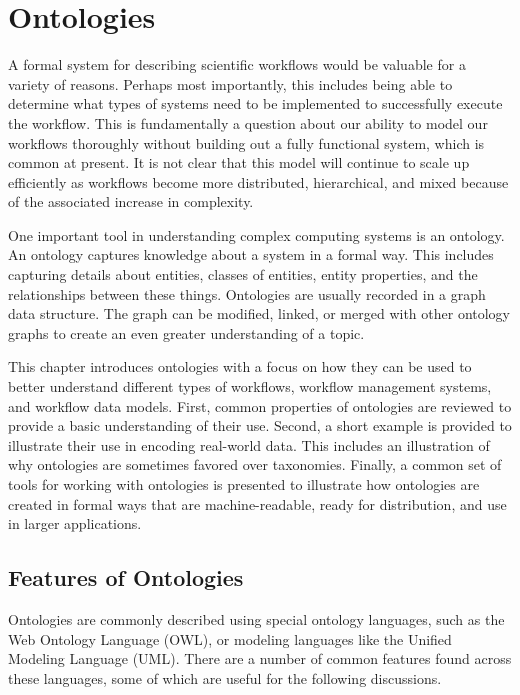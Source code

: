\chapter{Ontologies} \label{ch:ontologies}

A formal system for describing scientific workflows would be valuable for a
variety of reasons. Perhaps most importantly, this includes being able to
determine what types of systems need to be implemented to successfully execute
the workflow. This is fundamentally a question about our ability to model our
workflows thoroughly without building out a fully functional system, which is
common at present. It is not clear that this model will continue to scale up
efficiently as workflows become more distributed, hierarchical, and mixed
because of the associated increase in complexity. 

One important tool in understanding complex computing systems is an ontology.
An ontology captures knowledge about a system in a formal way. This includes
capturing details about entities, classes of entities, entity properties, and
the relationships between these things. Ontologies are usually recorded in a
graph data structure. The graph can be modified, linked, or merged with other
ontology graphs to create an even greater understanding of a topic.

This chapter introduces ontologies with a focus on how they can be used to
better understand different types of workflows, workflow management systems,
and workflow data models. First, common properties of ontologies are reviewed to
provide a basic understanding of their use. Second, a short example is provided
to illustrate their use in encoding real-world data. This includes an
illustration of why ontologies are sometimes favored over taxonomies. Finally, a
common set of tools for working with ontologies is presented to illustrate how
ontologies are created in formal ways that are machine-readable, ready for
distribution, and use in larger applications.

\section{Features of Ontologies}

Ontologies are commonly described using special ontology languages, such as the
Web Ontology Language (OWL), or modeling languages like the Unified Modeling
Language (UML). There are a number of common features found across these
languages, some of which are useful for the following discussions. 

